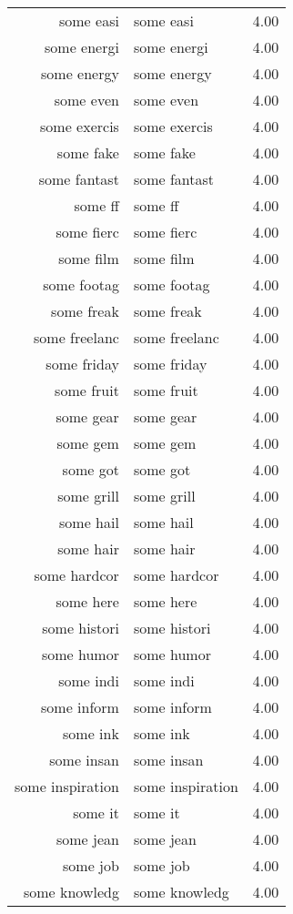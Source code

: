 \begin{table}[ht]
\begin{tabular}{rlr}
  some easi & some easi & 4.00 \\ 
  some energi & some energi & 4.00 \\ 
  some energy & some energy & 4.00 \\ 
  some even & some even & 4.00 \\ 
  some exercis & some exercis & 4.00 \\ 
  some fake & some fake & 4.00 \\ 
  some fantast & some fantast & 4.00 \\ 
  some ff & some ff & 4.00 \\ 
  some fierc & some fierc & 4.00 \\ 
  some film & some film & 4.00 \\ 
  some footag & some footag & 4.00 \\ 
  some freak & some freak & 4.00 \\ 
  some freelanc & some freelanc & 4.00 \\ 
  some friday & some friday & 4.00 \\ 
  some fruit & some fruit & 4.00 \\ 
  some gear & some gear & 4.00 \\ 
  some gem & some gem & 4.00 \\ 
  some got & some got & 4.00 \\ 
  some grill & some grill & 4.00 \\ 
  some hail & some hail & 4.00 \\ 
  some hair & some hair & 4.00 \\ 
  some hardcor & some hardcor & 4.00 \\ 
  some here & some here & 4.00 \\ 
  some histori & some histori & 4.00 \\ 
  some humor & some humor & 4.00 \\ 
  some indi & some indi & 4.00 \\ 
  some inform & some inform & 4.00 \\ 
  some ink & some ink & 4.00 \\ 
  some insan & some insan & 4.00 \\ 
  some inspiration & some inspiration & 4.00 \\ 
  some it & some it & 4.00 \\ 
  some jean & some jean & 4.00 \\ 
  some job & some job & 4.00 \\ 
  some knowledg & some knowledg & 4.00 \\ 

\end{tabular}
\end{table}
